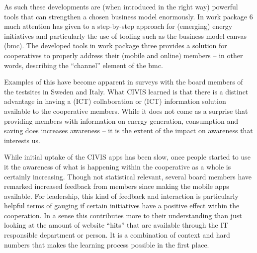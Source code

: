 As such these developments are (when introduced in the right way) powerful tools that can strengthen a chosen business model enormously. In work package 6 much attention has given to a step-by-step approach for (emerging) energy initiatives and particularly the use of tooling such as the business model canvas (bmc). The developed tools in work package three provides a solution for cooperatives to properly address their (mobile and online) members -- in other words, describing the ``channel'' element of the bmc.

Examples of this have become apparent in surveys with the board members of the testsites in Sweden and Italy. What CIVIS learned is that there is a distinct advantage in having a (ICT) collaboration or (ICT) information solution available to the cooperative members. While it does not come as a surprise that providing members with information on energy generation, consumption and saving does increases awareness -- it is the extent of the impact on awareness that interests us.

While initial uptake of the CIVIS apps has been slow, once people started to use it the awareness of what is happening within the cooperative as a whole is certainly increasing. Though not statistical relevant, several board members have remarked increased feedback from members since making the mobile apps available. For leadership, this kind of feedback and interaction is particularly helpful terms of gauging if certain initiatives have a positive effect within the cooperation. In a sense this contributes more to their understanding than just looking at the amount of website ``hits'' that are available through the IT responsible department or person. It is a combination of context and hard numbers that makes the learning process possible in the first place. 
